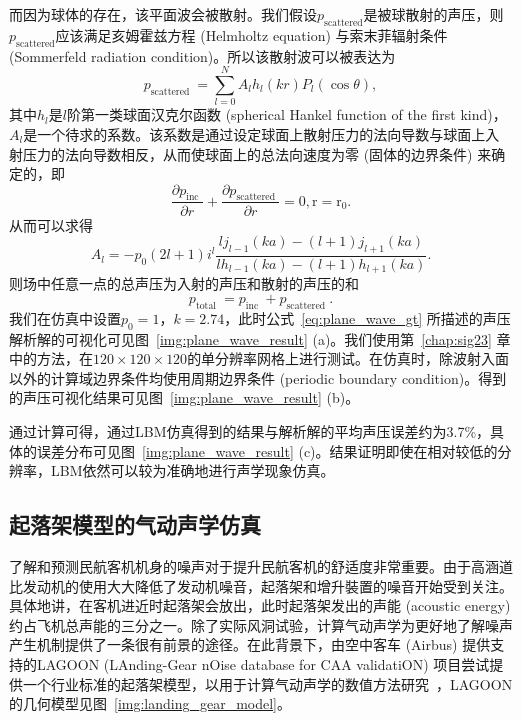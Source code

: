 而因为球体的存在，该平面波会被散射。我们假设$p_{\text {scattered}}$是被球散射的声压，则$p_{\text {scattered}}$应该满足亥姆霍兹方程 (Helmholtz equation) 与索末菲辐射条件 (Sommerfeld radiation condition)。所以该散射波可以被表达为
\begin{equation}
  p_{\text {scattered }}=\sum_{l=0}^{N} A_{l} h_{l}(k r) P_{l}(\cos \theta),
\end{equation}
其中$h_{l}$是$l$阶第一类球面汉克尔函数 (spherical Hankel function of the first kind)，$A_{l}$是一个待求的系数。该系数是通过设定球面上散射压力的法向导数与球面上入射压力的法向导数相反，从而使球面上的总法向速度为零 (固体的边界条件) 来确定的，即
\begin{equation}
  \frac{\partial p_{\text {inc }}}{\partial r}+\frac{\partial p_{\text {scattered }}}{\partial r}=0, \mathrm{r}=\mathrm{r_0}.
\end{equation}
从而可以求得
\begin{equation}
  A_{l}=-p_{0}(2 l+1) i^{l} \frac{l j_{l-1}(k a)-(l+1) j_{l+1}(k a)}{l h_{l-1}(k a)-(l+1) h_{l+1}(k a)}.
\end{equation}
则场中任意一点的总声压为入射的声压和散射的声压的和
\begin{equation}
  p_{\text {total }}=p_{\text {inc }}+p_{\text {scattered }}.
  \label{eq:plane_wave_gt}
\end{equation}
我们在仿真中设置$p_0=1$，$k=2.74$，此时公式~\ref{eq:plane_wave_gt} 所描述的声压解析解的可视化可见图~\ref{img:plane_wave_result} (a)。我们使用第~\ref{chap:sig23} 章中的方法，在$120\times120\times120$的单分辨率网格上进行测试。在仿真时，除波射入面以外的计算域边界条件均使用周期边界条件 (periodic boundary condition)。得到的声压可视化结果可见图~\ref{img:plane_wave_result} (b)。

通过计算可得，通过LBM仿真得到的结果与解析解的平均声压误差约为3.7\%，具体的误差分布可见图~\ref{img:plane_wave_result} (c)。结果证明即使在相对较低的分辨率，LBM依然可以较为准确地进行声学现象仿真。

\subsection{起落架模型的气动声学仿真}
\label{sec:acoustic_results}

了解和预测民航客机机身的噪声对于提升民航客机的舒适度非常重要。由于高涵道比发动机的使用大大降低了发动机噪音，起落架和增升裝置的噪音开始受到关注。具体地讲，在客机进近时起落架会放出，此时起落架发出的声能 (acoustic energy) 约占飞机总声能的三分之一。除了实际风洞试验，计算气动声学为更好地了解噪声产生机制提供了一条很有前景的途径。在此背景下，由空中客车 (Airbus) 提供支持的LAGOON (LAnding-Gear nOise database for CAA validatiON) 项目尝试提供一个行业标准的起落架模型，以用于计算气动声学的数值方法研究~\citep{doi:10.2514/6.2008-2816, doi:10.2514/6.2009-3277}，LAGOON的几何模型见图~\ref{img:landing_gear_model}。

